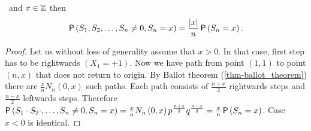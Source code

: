 \begin{thm}\label{thm-probability_position_b_at_time_n_without_return_origin}
 \Lrw\ and $x \in \mathbb{Z}$ then
 \[\operatorname{\mathsf{P}} \left( S_1, S_2, \ldots, S_{n}\neq 0, S_n=x \right)
 =\frac{\left|{x}\right|}{n}\operatorname{\mathsf{P}} \left( S_n=x \right).
 \]
\end{thm}
\begin{proof}
 Let us without loss of generality assume that $x>0$. In that case, first step has to be rightwards $\left(X_1=+1\right).$ Now we have path from point $ \left( 1,1 \right) $ to point $ \left( n,x \right) $ that does not return to origin.
 By Ballot theorem (\ref{thm-ballot_theorem}) there are $\frac{x}{n}N_n \left( 0,x \right) $ such paths. Each path consists of $\frac{n+x}{2}$ rightwards steps and $\frac{n-x}{2}$ leftwards steps.
 Therefore $\operatorname{\mathsf{P}} \left( S_1\cdot S_2 \cdot, \ldots, S_n\neq 0, S_n=x \right)
 =\frac{x}{n}N_n \left( 0,x \right) p^{\frac{n+x}{2}}q^{\frac{n-x}{2}}
 =\frac{x}{n}\operatorname{\mathsf{P}} \left( S_n=x \right) $. Case $x<0$ is identical.
\end{proof}
\begin{comment}
\begin{thm}[Asine law for last return to the origin]\label{thm-return_origin_upto_time}
 \Lrws. The probability that the last return to origin up to \Time $2n$ occurred \intime $2k$
 is
 \[
 \pr \left( S_{2k}=0 \right) \pr \left( S_{2n-2k}=0 \right).
 \]
\end{thm}
\begin{proof}
 \[
  \begin{split}
     & \pr \left( S_{2k+1}, S_{2k+2}, \ldots, S_{2n} \neq 0, S_{2k}=0\right)\\
     & \gpr  \pr \left( S_{2k+1}, S_{2k+2}, \ldots, S_{2n}\neq 0 \mid S_{2k}=0 \right)\pr \left( S_{2k}=0 \right)\\
     & \overset{\text{L}\ref{lemma-temporal_homogeneity}}{=}\pr \left( S_{2k}=0 \right) \pr \left( S_{1}, S_{2}, \ldots, S_{2n-2k}\neq 0 \right)
     \overset{\text{T}\ref{thm-no_return=return}}{=}\pr \left( S_{2k}=0 \right) \pr \left( S_{2n-2k}=0 \right).
  \end{split}
 \]
\end{proof}
\end{comment}

